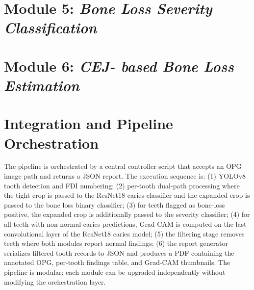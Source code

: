 \section{Module 5: \textit{Bone Loss Severity Classification}}
\label{sec:impl-module5}

\section{Module 6: \textit{CEJ- based Bone Loss Estimation}}
\label{sec:impl-module6}




\section{Integration and Pipeline Orchestration}
\label{sec:impl-integration}

The pipeline is orchestrated by a central controller script that accepts an OPG image path and returns a JSON report. The execution sequence is: (1) YOLOv8 tooth detection and FDI numbering; (2) per-tooth dual-path processing where the tight crop is passed to the ResNet18 caries classifier and the expanded crop is passed to the bone loss binary classifier; (3) for teeth flagged as bone-loss positive, the expanded crop is additionally passed to the severity classifier; (4) for all teeth with non-normal caries predictions, Grad-CAM is computed on the last convolutional layer of the ResNet18 caries model; (5) the filtering stage removes teeth where both modules report normal findings; (6) the report generator serializes filtered tooth records to JSON and produces a PDF containing the annotated OPG, per-tooth findings table, and Grad-CAM thumbnails. The pipeline is modular: each module can be upgraded independently without modifying the orchestration layer.
